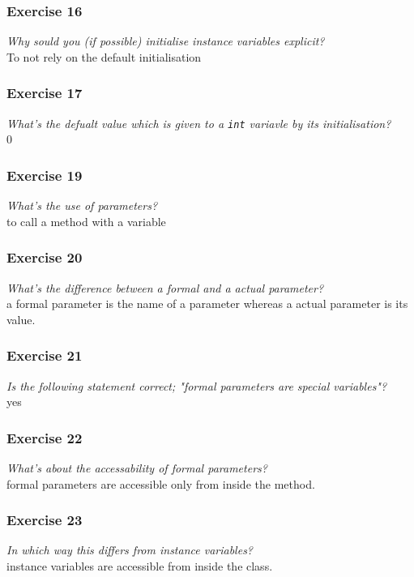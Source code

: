 \subsubsection*{Exercise 16}
\textit{Why sould you (if possible) initialise instance variables explicit?}\\
To not rely on the default initialisation

\subsubsection*{Exercise 17}
\textit{What's the defualt value which is given to a \lstinline{int} variavle
	by its initialisation?}\\
0

\subsubsection*{Exercise 19}
\textit{What's the use of parameters?}\\
to call a method with a variable

\subsubsection*{Exercise 20}
\textit{What's the difference between a formal and a actual parameter?}\\
a formal parameter is the name of a parameter whereas a actual parameter is its 
value. 

\subsubsection*{Exercise 21}
\textit{Is the following statement correct; "formal parameters are special
	variables"?}\\
yes

\subsubsection*{Exercise 22}
\textit{What's about the accessability of formal parameters?}\\
formal parameters are accessible only from inside the method. 

\subsubsection*{Exercise 23}
\textit{In which way this differs from instance variables?}\\
instance variables are accessible from inside the class. 
